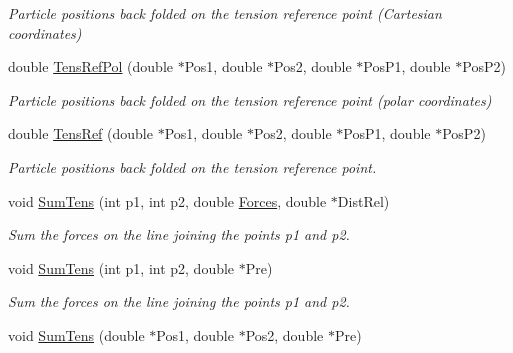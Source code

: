 \begin{DoxyCompactItemize}
\begin{DoxyCompactList}\small\item\em Particle positions back folded on the tension reference point (Cartesian coordinates) \end{DoxyCompactList}\item 
double \hyperlink{classForces_a8d63955572a8c5888a8a305fb56ada48}{Tens\+Ref\+Pol} (double $\ast$Pos1, double $\ast$Pos2, double $\ast$Pos\+P1, double $\ast$Pos\+P2)\hypertarget{classForces_a8d63955572a8c5888a8a305fb56ada48}{}\label{classForces_a8d63955572a8c5888a8a305fb56ada48}

\begin{DoxyCompactList}\small\item\em Particle positions back folded on the tension reference point (polar coordinates) \end{DoxyCompactList}\item 
double \hyperlink{classForces_ab49daa22c5de576835d55d185f1a53be}{Tens\+Ref} (double $\ast$Pos1, double $\ast$Pos2, double $\ast$Pos\+P1, double $\ast$Pos\+P2)\hypertarget{classForces_ab49daa22c5de576835d55d185f1a53be}{}\label{classForces_ab49daa22c5de576835d55d185f1a53be}

\begin{DoxyCompactList}\small\item\em Particle positions back folded on the tension reference point. \end{DoxyCompactList}\item 
void \hyperlink{classForces_a1a74ebb3cab127dd10c8d642fb19a537}{Sum\+Tens} (int p1, int p2, double \hyperlink{classForces}{Forces}, double $\ast$Dist\+Rel)\hypertarget{classForces_a1a74ebb3cab127dd10c8d642fb19a537}{}\label{classForces_a1a74ebb3cab127dd10c8d642fb19a537}

\begin{DoxyCompactList}\small\item\em Sum the forces on the line joining the points p1 and p2. \end{DoxyCompactList}\item 
void \hyperlink{classForces_a898790f8f00dd994c472c5526c454b77}{Sum\+Tens} (int p1, int p2, double $\ast$Pre)\hypertarget{classForces_a898790f8f00dd994c472c5526c454b77}{}\label{classForces_a898790f8f00dd994c472c5526c454b77}

\begin{DoxyCompactList}\small\item\em Sum the forces on the line joining the points p1 and p2. \end{DoxyCompactList}\item 
void \hyperlink{classForces_aa4ae1e5942505c407b95ebf6d88156eb}{Sum\+Tens} (double $\ast$Pos1, double $\ast$Pos2, double $\ast$Pre)\hypertarget{classForces_aa4ae1e5942505c407b95ebf6d88156eb}{}\label{classForces_aa4ae1e5942505c407b95ebf6d88156eb}


\end{DoxyCompactItemize}
